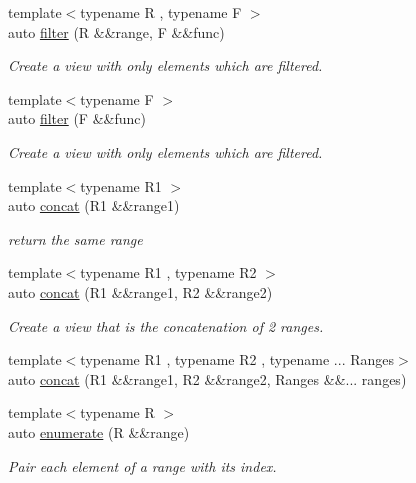 \begin{DoxyCompactItemize}
{\footnotesize template$<$typename R , typename F $>$ }\\auto \mbox{\hyperlink{namespacerah_1_1view_a69010369aadc2a36ee9517195f783e9a}{filter}} (R \&\&range, F \&\&func)
\begin{DoxyCompactList}\small\item\em Create a view with only elements which are filtered. \end{DoxyCompactList}\item 
{\footnotesize template$<$typename F $>$ }\\auto \mbox{\hyperlink{namespacerah_1_1view_aa52c6f5cff4e0a4f0ed48c66e1039e3d}{filter}} (F \&\&func)
\begin{DoxyCompactList}\small\item\em Create a view with only elements which are filtered. \end{DoxyCompactList}\item 
{\footnotesize template$<$typename R1 $>$ }\\auto \mbox{\hyperlink{namespacerah_1_1view_ad7cd13dd36976288286478b47c3f5747}{concat}} (R1 \&\&range1)
\begin{DoxyCompactList}\small\item\em return the same range \end{DoxyCompactList}\item 
{\footnotesize template$<$typename R1 , typename R2 $>$ }\\auto \mbox{\hyperlink{namespacerah_1_1view_a4810fe58bc1fa799032bc4bccea05a2d}{concat}} (R1 \&\&range1, R2 \&\&range2)
\begin{DoxyCompactList}\small\item\em Create a view that is the concatenation of 2 ranges. \end{DoxyCompactList}\item 
{\footnotesize template$<$typename R1 , typename R2 , typename ... Ranges$>$ }\\auto \mbox{\hyperlink{namespacerah_1_1view_a830061cf022e907eefb65aba6a35573d}{concat}} (R1 \&\&range1, R2 \&\&range2, Ranges \&\&... ranges)
\item 
{\footnotesize template$<$typename R $>$ }\\auto \mbox{\hyperlink{namespacerah_1_1view_a3400a50c2b0e90330850128c2b7605d0}{enumerate}} (R \&\&range)
\begin{DoxyCompactList}\small\item\em Pair each element of a range with its index. \end{DoxyCompactList}\item 

\end{DoxyCompactItemize}

